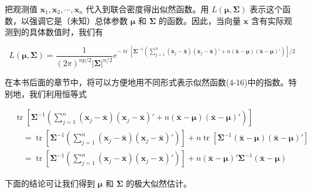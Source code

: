 把观测值 $\mathbf{x}_1,\mathbf{x}_2,\cdots,\mathbf{x}_n$ 代入到联合密度得出似然函数。用 $L(\boldsymbol{\mu},\boldsymbol{\Sigma})$ 表示这个函数，以强调它是（未知）总体参数 $\boldsymbol{\mu}$ 和 $\boldsymbol{\Sigma}$ 的函数。因此，当向量 $\mathbf{x}$ 含有实际观测到的具体数值时，我们有

\label{eq:4-16}
\begin{equation}
L(\boldsymbol{\mu},\boldsymbol{\Sigma})=\frac{1}{(2\pi)^{np/2}|\boldsymbol{\Sigma}|^{n/2}}e^{-\operatorname{tr}\left[\boldsymbol{\Sigma}^{-1}\left(\sum_{j=1}^{n}(\mathbf{x}_j-\bar{\mathbf{x}})(\mathbf{x}_j-\bar{\mathbf{x}})'+n(\bar{\mathbf{x}}-\boldsymbol{\mu})(\bar{\mathbf{x}}-\boldsymbol{\mu})'\right)\right]/2}
\tag{4-16}
\end{equation}

在本书后面的章节中，将可以方便地用不同形式表示似然函数(4-16)中的指数。特别地，我们利用恒等式

\label{eq:4-17}
\begin{equation}
\begin{aligned}
&\operatorname{tr}\left[\boldsymbol{\Sigma}^{-1}\left(\sum_{j=1}^{n}(\mathbf{x}_j-\bar{\mathbf{x}})(\mathbf{x}_j-\bar{\mathbf{x}})'+n(\bar{\mathbf{x}}-\boldsymbol{\mu})(\bar{\mathbf{x}}-\boldsymbol{\mu})'\right)\right]\\
&\quad=\operatorname{tr}\left[\boldsymbol{\Sigma}^{-1}\left(\sum_{j=1}^{n}(\mathbf{x}_j-\bar{\mathbf{x}})(\mathbf{x}_j-\bar{\mathbf{x}})'\right)\right]+n\operatorname{tr}\left[\boldsymbol{\Sigma}^{-1}(\bar{\mathbf{x}}-\boldsymbol{\mu})(\bar{\mathbf{x}}-\boldsymbol{\mu})'\right]\\
&\quad=\operatorname{tr}\left[\boldsymbol{\Sigma}^{-1}\left(\sum_{j=1}^{n}(\mathbf{x}_j-\bar{\mathbf{x}})(\mathbf{x}_j-\bar{\mathbf{x}})'\right)\right]+n(\bar{\mathbf{x}}-\boldsymbol{\mu})'\boldsymbol{\Sigma}^{-1}(\bar{\mathbf{x}}-\boldsymbol{\mu})
\end{aligned}
\tag{4-17}
\end{equation}


下面的结论可让我们得到 $\boldsymbol{\mu}$ 和 $\boldsymbol{\Sigma}$ 的极大似然估计。


